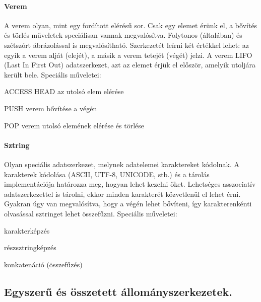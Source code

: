 \paragraph{Verem}
A verem olyan, mint egy fordított elérésű sor. Csak egy elemet érünk el, a bővítés és törlés műveletek speciálisan vannak megvalósítva. Folytonos (általában) és szétszórt ábrázolással is megvalósítható. Szerkezetét leírni két értékkel lehet: az egyik a verem alját (elejét), a másik a verem tetejét (végét) jelzi. A verem LIFO (Last In First Out) adatszerkezet, azt az elemet érjük el először, amelyik utoljára került bele. Speciális műveletei:
\begin{enumdescript}[nosep]
	\item[ACCESS HEAD]  az utolsó elem elérése
	\item[PUSH]  verem bővítése a végén
	\item[POP]  verem utolsó elemének elérése és törlése
\end{enumdescript}

\paragraph{Sztring}
Olyan speciális adatszerkezet, melynek adatelemei karaktereket kódolnak. A karakterek kódolása (ASCII, UTF-8, UNICODE, stb.) és a tárolás implementációja határozza meg, hogyan lehet kezelni őket. Lehetséges asszociatív adatszerkezettel is tárolni, ekkor minden karakterét közvetlenül el lehet érni. Gyakran úgy van megvalósítva, hogy a végén lehet bővíteni, így karakterenkénti olvasással sztringet lehet összefűzni. Speciális műveletei:
\begin{enumdescript}[nosep]
	\item karakterképzés
	\item részsztringképzés
	\item konkatenáció (összefűzés)
\end{enumdescript}

\subsection{Egyszerű és összetett állományszerkezetek.}

